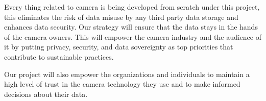 \documentclass[a4paper, 11pt, oneside]{uet_thesis}  %
\begin{document}
Every thing related to camera is being developed from scratch under this project, this eliminates the risk of data misuse by any third party data storage and enhances data security. Our strategy will ensure that the data stays in the hands of the camera owners. This will empower the camera industry and the audience of it by putting privacy, security, and data sovereignty as top priorities that contribute to sustainable practices.

Our project will also empower the organizations and individuals to maintain a high level of trust in the camera technology they use and to  make informed decisions about their data. 

\clearpage	%

\pagestyle{fancy}  %

\tableofcontents  %

\listoffigures  %

\listoftables  %
\end{document}

